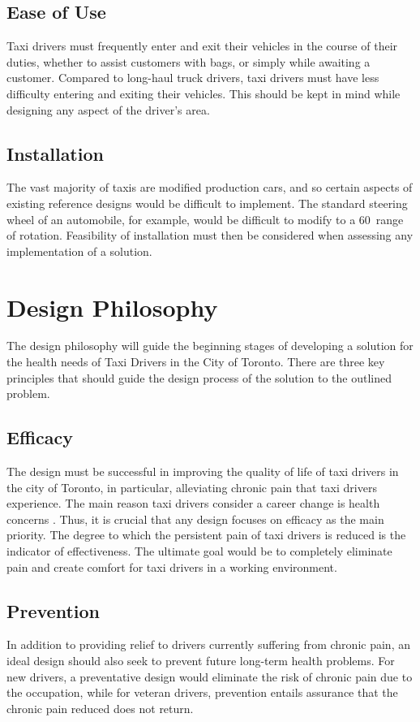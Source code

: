 \documentclass[11pt]{article}
\begin{document}
\subsection{Ease of Use}
\label{sec:ease}
Taxi drivers must frequently enter and exit their vehicles in the course of
their duties, whether to assist customers with bags, or simply while awaiting
a customer. Compared to long-haul truck drivers, taxi drivers must have less
difficulty entering and exiting their vehicles. This should be kept in mind
while designing any aspect of the driver's area.
\subsection{Installation}
\label{sec:installation}

The vast majority of taxis are modified production cars, %
and so certain aspects of existing reference designs would be difficult to
implement. The standard steering wheel of an automobile, for example,
would be difficult to modify to a 60\textdegree~range of
rotation\cite{Ismail2003}. Feasibility of installation must then
be considered when assessing any implementation of a solution.

\section{Design Philosophy}
\label{sec:philo}
The design philosophy will guide the beginning stages of developing a
solution for the health needs of Taxi Drivers in the City of
Toronto. There are three key principles that should
guide the design process of the solution to the outlined problem.
 
\subsection{Efficacy}
The design must be successful in improving the quality of life of taxi 
drivers in the city of Toronto, in particular, alleviating chronic pain 
that taxi drivers experience. The main reason taxi drivers consider a 
career change is health concerns \cite{chicago}. Thus, it is crucial that 
any design focuses on efficacy as the main priority. The degree to which 
the persistent pain of taxi drivers is reduced is the indicator of 
effectiveness. The ultimate goal would be to completely eliminate pain 
and create comfort for taxi drivers in a working environment. 

\subsection{Prevention}
In addition to providing relief to drivers currently suffering from 
chronic pain, an ideal design should also seek to prevent future long-term 
health problems. For new drivers, a preventative design would eliminate
the risk of chronic pain due to the occupation, while for veteran 
drivers, prevention entails assurance that the chronic pain reduced does
not return. 
 
\end{document}
